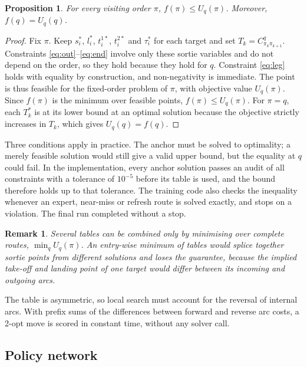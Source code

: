 \documentclass[preprint,12pt,authoryear]{elsarticle}
\newtheorem{proposition}{Proposition}
\newtheorem{remark}{Remark}
\begin{document}
\begin{proposition}
\label{prop:bound}
For every visiting order $\pi$, $f(\pi) \le U_{q}(\pi)$. Moreover, $f(q) = U_{q}(q)$.
\end{proposition}

\begin{proof}
Fix $\pi$. Keep $s^{*}_{i}$, $l^{*}_{i}$, $t^{1*}_{i}$, $t^{2*}_{i}$ and $\tau^{*}_{i}$ for each target and set $T_{k} = C^{q}_{\pi_{k}\pi_{k+1}}$. Constraints \eqref{eq:out}--\eqref{eq:end} involve only these sortie variables and do not depend on the order, so they hold because they hold for $q$. Constraint \eqref{eq:leg} holds with equality by construction, and non-negativity is immediate. The point is thus feasible for the fixed-order problem of $\pi$, with objective value $U_{q}(\pi)$. Since $f(\pi)$ is the minimum over feasible points, $f(\pi) \le U_{q}(\pi)$. For $\pi = q$, each $T^{*}_{k}$ is at its lower bound at an optimal solution because the objective strictly increases in $T_{k}$, which gives $U_{q}(q) = f(q)$.
\end{proof}

Three conditions apply in practice. The anchor must be solved to optimality; a merely feasible solution would still give a valid upper bound, but the equality at $q$ could fail. In the implementation, every anchor solution passes an audit of all constraints with a tolerance of $10^{-5}$ before its table is used, and the bound therefore holds up to that tolerance. The training code also checks the inequality whenever an expert, near-miss or refresh route is solved exactly, and stops on a violation. The final run completed without a stop.

\begin{remark}
Several tables can be combined only by minimising over complete routes, $\min_{q} U_{q}(\pi)$. An entry-wise minimum of tables would splice together sortie points from different solutions and loses the guarantee, because the implied take-off and landing point of one target would differ between its incoming and outgoing arcs.
\end{remark}

The table is asymmetric, so local search must account for the reversal of internal arcs. With prefix sums of the differences between forward and reverse arc costs, a 2-opt move is scored in constant time, without any solver call.

\subsection{Policy network}
\end{document}
